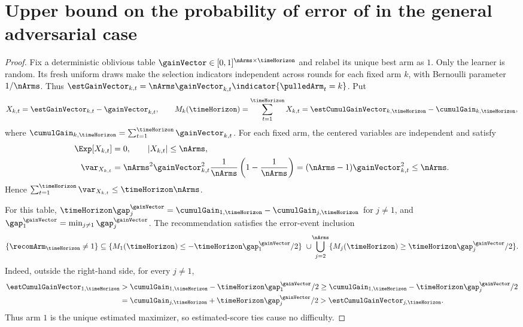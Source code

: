 \section{Upper bound on the probability of error of \RULE{} in the 
	general adversarial case} %
\label{app:proofupadPRO}
%
\setcounter{scratchcounter}{\value{theorem}}
\tata*
\setcounter{theorem}{\the\numexpr\value{scratchcounter}}
\begin{proof}%
Fix a deterministic oblivious table
$\gainVector\in[0,1]^{\nArms\times\timeHorizon}$ and relabel its unique
best arm as $1$. Only the learner is random. Its fresh uniform draws
make the selection indicators independent across rounds for each
fixed arm $k$, with Bernoulli parameter $1/\nArms$.
Thus $\estGainVector_{k,t}=\nArms\gainVector_{k,t}\indicator{\pulledArm_t=k}$.
Put
\[
X_{k,t}=\estGainVector_{k,t}-\gainVector_{k,t},\qquad
M_k(\timeHorizon)=\sum_{t=1}^{\timeHorizon}X_{k,t}
=\estCumulGainVector_{k,\timeHorizon}-\cumulGain_{k,\timeHorizon},
\]
where $\cumulGain_{k,\timeHorizon}=\sum_{t=1}^{\timeHorizon}\gainVector_{k,t}$.
For each fixed arm, the centered variables are independent and satisfy
\begin{align*}
\Exp[X_{k,t}]&=0,\qquad |X_{k,t}|\leq\nArms,\\
\var_{X_{k,t}}
&=\nArms^2\gainVector_{k,t}^2\frac1{\nArms}
\left(1-\frac1{\nArms}\right)
=(\nArms-1)\gainVector_{k,t}^2\leq\nArms.
\end{align*}
Hence $\sum_{t=1}^{\timeHorizon}\var_{X_{k,t}}\leq\timeHorizon\nArms$.

For this table,
$\timeHorizon\gap_j^{\gainVector}
=\cumulGain_{1,\timeHorizon}-\cumulGain_{j,\timeHorizon}$ for $j\neq1$,
and $\gap_1^{\gainVector}=\min_{j\neq1}\gap_j^{\gainVector}$.
The recommendation satisfies the error-event inclusion
\[
\{\recomArm_{\timeHorizon}\neq1\}
\subseteq
\{M_1(\timeHorizon)\leq-\timeHorizon\gap_1^{\gainVector}/2\}
\ \cup\!
\bigcup_{j=2}^{\nArms}
\{M_j(\timeHorizon)\geq\timeHorizon\gap_j^{\gainVector}/2\}.
\]
Indeed, outside the right-hand side, for every $j\neq1$,
\begin{align*}
\estCumulGainVector_{1,\timeHorizon}
&>\cumulGain_{1,\timeHorizon}-\timeHorizon\gap_1^{\gainVector}/2
\geq\cumulGain_{1,\timeHorizon}-\timeHorizon\gap_j^{\gainVector}/2\\
&=\cumulGain_{j,\timeHorizon}+\timeHorizon\gap_j^{\gainVector}/2
>\estCumulGainVector_{j,\timeHorizon}.
\end{align*}
Thus arm $1$ is the unique estimated maximizer, so estimated-score
ties cause no difficulty.


\end{proof}
